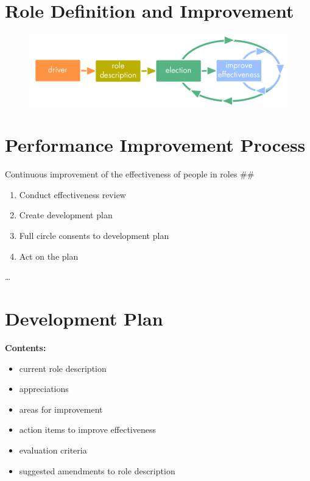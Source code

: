 \section{Role Definition and Improvement}
\label{roledefinitionandimprovement}

\begin{figure}[htbp]
\centering
\includegraphics[keepaspectratio,width=\textwidth,height=0.75\textheight]{img/people-and-roles/role-improvement.png}
\end{figure}

\section{Performance Improvement Process}
\label{performanceimprovementprocess}

Continuous improvement of the effectiveness of people in roles \#\#

\begin{enumerate}
\item Conduct effectiveness review

\item Create development plan

\item Full circle consents to development plan

\item Act on the plan

\end{enumerate}

{\ldots}

\section{Development Plan}
\label{developmentplan}

\textbf{Contents:}

\begin{itemize}
\item current role description

\item appreciations

\item areas for improvement

\item action items to improve effectiveness

\item evaluation criteria

\item suggested amendments to role description

\end{itemize}

